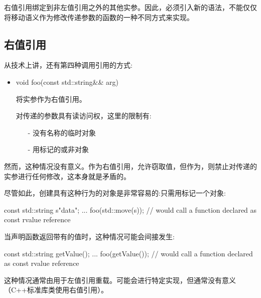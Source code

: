 右值引用绑定到非左值引用之外的其他实参。因此，必须引入新的语法，不能仅仅将移动语义作为修改传递参数的函数的一种不同方式来实现。

\subsection{右值引用}

从技术上讲，还有第四种调用引用的方式:

\begin{itemize}
	\item \begin{cppcode}
void foo(const std::string\&\& arg)
\end{cppcode}
	将实参作为右值引用。

	对传递的参数具有读访问权，这里的限制有:
	\begin{itemize}
		\item[-] 没有名称的临时对象
		\item[-] 用标记的或非对象
	\end{itemize}
\end{itemize}

然而，这种情况没有意义。作为右值引用，允许窃取值，但作为，则禁止对传递的实参进行任何修改，这本身就是矛盾的。

尽管如此，创建具有这种行为的对象是非常容易的:只需用标记一个对象:

\begin{cppcode}
const std::string s{"data"};
...
foo(std::move(s)); // would call a function declared as const rvalue reference
\end{cppcode}

当声明函数返回带有的值时，这种情况可能会间接发生:

\begin{cppcode}
const std::string getValue();
...
foo(getValue()); // would call a function declared as const rvalue reference
\end{cppcode}

这种情况通常由用于左值引用重载。可能会进行特定实现，但通常没有意义（C++标准库类使用右值引用）。




















































